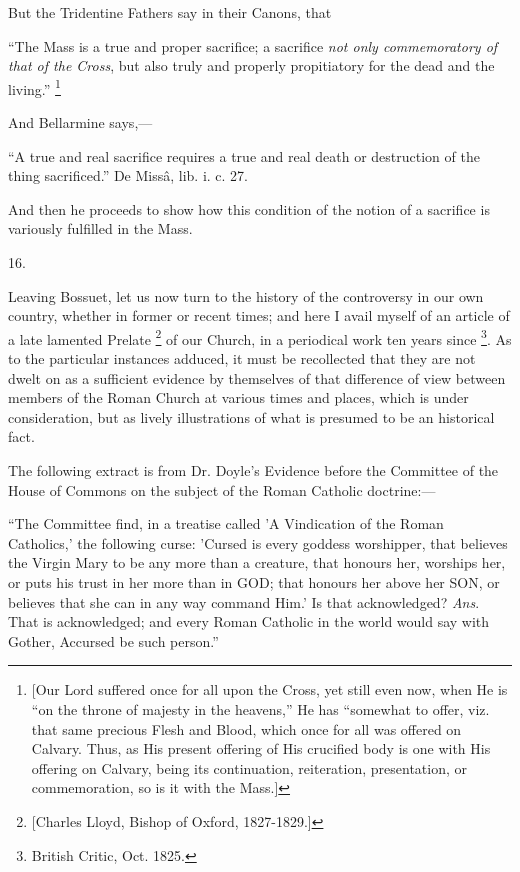 But the Tridentine Fathers say in their Canons,
that

``The
Mass is a true and proper sacrifice; a sacrifice \emph{not only
commemoratory of that of the Cross}, but also truly and properly
propitiatory for the dead and the living.'' \footnote{[Our Lord suffered once for all upon the Cross, yet still even now,
when He is ``on the throne of majesty in the heavens,'' He has ``somewhat
to offer, viz. that same precious Flesh and Blood, which once for all
was offered on Calvary. Thus, as His present offering of His crucified
body is one with His offering on Calvary, being its continuation,
reiteration, presentation, or commemoration, so is it with the Mass.]}

And Bellarmine says,—

``A
true and real sacrifice requires a true and real death or destruction
of the thing sacrificed.'' De Missâ, lib. i. c. 27.

And then he proceeds to show how this condition
of the notion of a sacrifice is variously fulfilled in the Mass.

16.

Leaving Bossuet, let us now turn to the history
of the controversy in our own country, whether in former or recent
times; and here I avail myself of an article of a late lamented
Prelate \footnote{[Charles Lloyd, Bishop of Oxford, 1827-1829.]} of our Church,
in a periodical work ten years since \footnote{British Critic, Oct. 1825.}. As to the particular instances adduced, it must be
recollected that they are not dwelt on as a sufficient evidence by
themselves of that difference of view between members of the Roman
Church at various times and places, which is under consideration, but
as lively illustrations of what is presumed to be an historical fact.

The following extract is from Dr. Doyle's
Evidence before the Committee of the House of Commons on the subject
of the Roman Catholic doctrine:—

``The
Committee find, in a treatise called 'A Vindication of the Roman
Catholics,' the following curse: 'Cursed is every goddess worshipper,
that believes the Virgin Mary to be any more than a creature, that
honours her, worships her, or puts his trust in her more than in GOD;
that honours her above her SON,
or believes that she can in any way command Him.' Is that
acknowledged? \emph{Ans}. That is acknowledged; and every Roman
Catholic in the world would say with Gother, Accursed be such person.''


